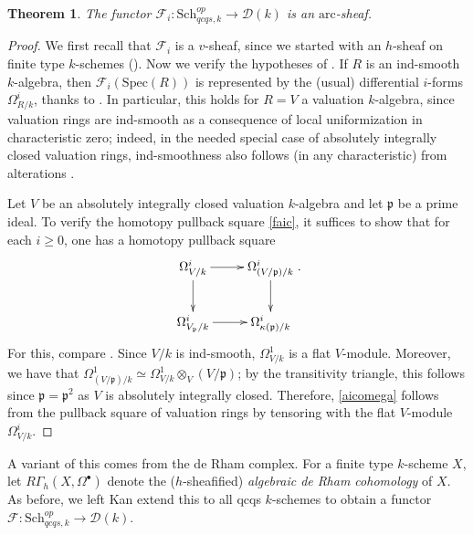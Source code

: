 \documentclass[reqno]{amsart}
\newcommand{\sF}{\mathcal{F}}
\newcommand{\spec}{\mathrm{Spec}}
\newcommand{\arc}{\mathrm{arc}}
\newcommand{\D}{\mathcal{D}}
\newtheorem{theorem}{Theorem}[section]
\theoremstyle{definition}
\begin{document}
\begin{theorem} 
\label{hdifferentialsarearc}
The functor $\sF_i\colon \mathrm{Sch}_{qcqs,k}^{op} \to \D(k)$
is an $\arc$-sheaf. 
\end{theorem} 
\begin{proof} 
We first recall that $\sF_i$ is a $v$-sheaf, since we started with an $h$-sheaf
on finite type $k$-schemes (). 
Now we verify the hypotheses of . 
 If $R$ is an $\mathrm{ind}$-smooth $k$-algebra, then 
$\sF_i(\spec(R))$ is represented by the (usual) 
differential $i$-forms $\Omega^i_{R/k}$, thanks to \cite[Cor.~6.5]{HJ14}. 
In particular, this holds for $R=V$ a valuation $k$-algebra, since valuation rings
are $\mathrm{ind}$-smooth as a consequence of local uniformization
\cite{Zar40} in characteristic zero; indeed, in the needed special case
of absolutely integrally closed
valuation rings, ind-smoothness also follows (in any characteristic) from
alterations \cite{dJ96}.

Let $V$ be an absolutely integrally closed valuation $k$-algebra and let $\mathfrak{p}$ be a prime ideal. 
To verify the homotopy pullback square \eqref{faic}, it suffices to show that
for each $i \geq 0$, one has a homotopy pullback square
\begin{equation}  \label{aicomega}
\begin{aligned}
\xymatrix{
\Omega^i_{V/k} \ar[d]  \ar[r] &  \Omega^i_{(V/\mathfrak{p})/k} \ar[d]  \\
\Omega^i_{V_{\mathfrak{p}}/k} \ar[r] &  \Omega^i_{\kappa(\mathfrak{p})/k}
}. \end{aligned} \end{equation}
For this, compare \cite[Lem.~3.12]{HK18}. 
Since $V/k$ is ind-smooth, $\Omega^1_{V/k}$ is a flat $V$-module. 
Moreover, we have that 
$\Omega^1_{(V/\mathfrak{p})/k} \simeq \Omega^1_{V/k} \otimes_V
(V/\mathfrak{p})$; by the transitivity triangle, this follows since
$\mathfrak{p} = \mathfrak{p}^2$ as $V$ is absolutely integrally closed. 
Therefore, \eqref{aicomega} follows from the pullback square of valuation rings
by tensoring with the flat $V$-module $\Omega^i_{V/k}$. 
\end{proof} 

A variant of this comes from the de Rham complex. 
For a finite type $k$-scheme $X$, let $R\Gamma_h(X, \Omega^\bullet)$ denote the ($h$-sheafified) \emph{algebraic de Rham cohomology} of $X$. 
As before, we left Kan extend this to all qcqs $k$-schemes to obtain a functor 
$\sF\colon \mathrm{Sch}_{qcqs,k}^{op} \to \D(k)$. 
\end{document}

